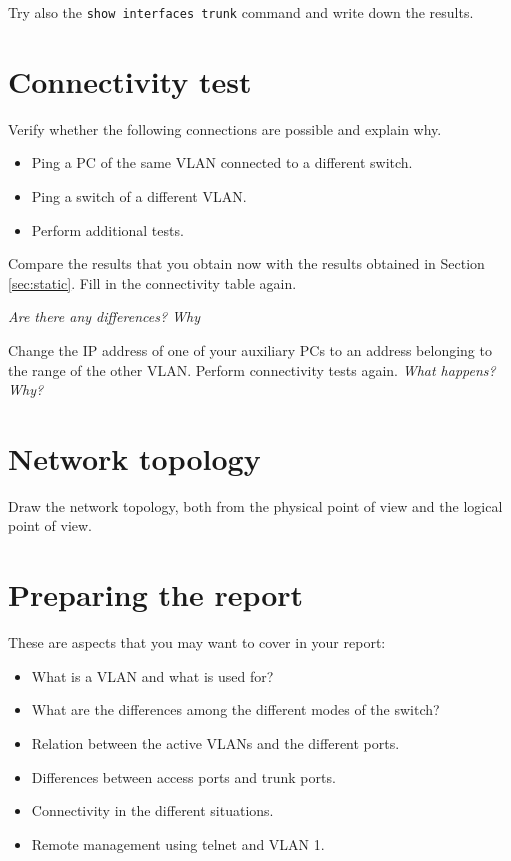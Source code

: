 Try also the \texttt{show interfaces trunk} command and write down the results.

\section{Connectivity test}

Verify whether the following connections are possible and explain why.
\begin{itemize}
\item Ping a PC of the same VLAN connected to a different switch.
\item Ping a  switch of a different VLAN.
\item Perform additional tests.
\end{itemize}

Compare the results that you obtain now with the results obtained in Section \ref{sec:static}.
Fill in the connectivity table again.

\emph{Are there any differences? Why}

Change the IP address of one of your auxiliary PCs to an address belonging to the range of the other VLAN.
Perform connectivity tests again.
\emph{What happens? Why?}

\section{Network topology}

Draw the network topology, both from the physical point of view and the logical point of view.

\section{Preparing the report}

These are aspects that you may want to cover in your report:
\begin{itemize}
\item What is a VLAN and what is used for?
\item What are the differences among the different modes of the switch?
\item Relation between the active VLANs and the different ports.
\item Differences between access ports and trunk ports.
\item Connectivity in the different situations.
\item Remote management using telnet and VLAN 1.
\end{itemize}


